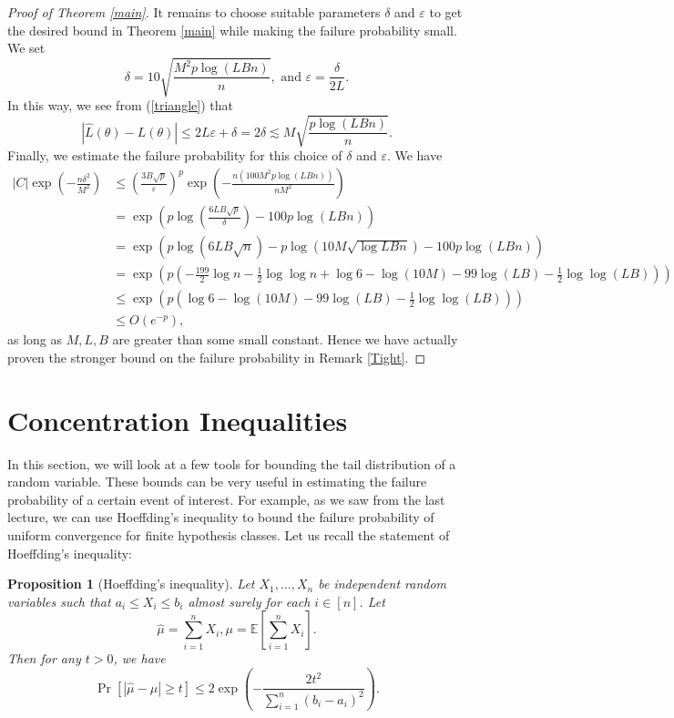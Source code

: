\documentclass[11pt]{article}
\newtheorem{proposition}[theorem]{Proposition}
\newcommand{\E}{\mathbb{E}}
\renewcommand{\epsilon}{\varepsilon}
\begin{document}
\begin{proof}[Proof of Theorem \ref{main}]
It remains to choose suitable parameters $\delta$ and $\epsilon$ to get the desired bound in Theorem \ref{main} while making the failure probability small. We set
$$  \delta = 10\sqrt{\frac{M^2p\log(LBn)}{n}}, \text{ and } \epsilon = \frac{\delta}{2L}.$$
In this way, we see from (\ref{triangle}) that
$$  |\hat L(\theta)- L(\theta)| \le 2L\epsilon + \delta = 2\delta \lesssim M\sqrt{\frac{p\log(LBn)}{n}}.$$
Finally, we estimate the failure probability for this choice of $\delta$ and $\epsilon$. We have
\begin{align*}
    |C|\exp\left(-\frac{n\delta^2}{M^2}\right) &\le \left(\frac{3B\sqrt{p}}{\epsilon}\right)^p \exp \left( - \frac{n(100M^2p\log(LBn))}{nM^2} \right)   \\
        &= \exp\left(p\log\left(\frac{6LB\sqrt{p}}{\delta}\right) - 100p\log(LBn) \right)\\
        &= \exp\left(p\log(6LB\sqrt{n}) - p \log(10M\sqrt{\log{LBn}}) - 100p\log(LBn)\right)\\
        &= \exp \left( p\left(-\frac{199}{2}\log n - \frac{1}{2} \log \log n  + \log 6 - \log (10M) -99 \log(LB) - \frac{1}{2} \log \log (LB)   \right) \right)\\
        &\le \exp \left( p\left(\log 6 - \log (10M) -99 \log(LB) - \frac{1}{2} \log \log (LB)   \right) \right)\\
        &\le O(e^{-p}),
\end{align*}
as long as $M, L, B$ are greater than some small constant.
Hence we have actually proven the stronger bound on the failure probability in Remark \ref{Tight}.
\end{proof}


\section{Concentration Inequalities}
In this section, we will look at a few tools for bounding the tail distribution of a random variable. These bounds can be very useful in estimating the failure probability of a certain event of interest. For example, as we saw from the last lecture, we can use Hoeffding's inequality to bound the failure probability of uniform convergence for finite hypothesis classes. Let us recall the statement of Hoeffding's inequality:

\begin{proposition}[Hoeffding's inequality]
Let $X_1, \dots, X_n$ be independent random variables such that $a_i \le X_i \le b_i$ almost surely for each $i \in [n]$. Let
$$  \hat \mu = \sum_{i=1}^n X_i, \mu = \E\left[\sum_{i=1}^n X_i \right].$$
Then for any $t>0$, we have
$$  \Pr[|\hat\mu - \mu| \ge t] \le 2\exp \left( -\frac{2t^2}{\sum_{i=1}^n (b_i-a_i)^2} \right).    $$
\end{proposition}
\end{document}
